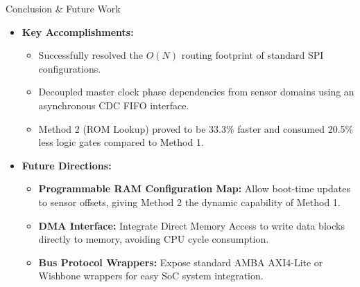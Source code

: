 \documentclass{beamer}
\begin{document}
\begin{frame}{Conclusion \& Future Work}
  \begin{itemize}
    \item \textbf{Key Accomplishments:}
    \begin{itemize}
      \item Successfully resolved the $O(N)$ routing footprint of standard SPI configurations.
      \item Decoupled master clock phase dependencies from sensor domains using an asynchronous CDC FIFO interface.
      \item Method 2 (ROM Lookup) proved to be 33.3\% faster and consumed 20.5\% less logic gates compared to Method 1.
    \end{itemize}
    \item \textbf{Future Directions:}
    \begin{itemize}
      \item \textbf{Programmable RAM Configuration Map:} Allow boot-time updates to sensor offsets, giving Method 2 the dynamic capability of Method 1.
      \item \textbf{DMA Interface:} Integrate Direct Memory Access to write data blocks directly to memory, avoiding CPU cycle consumption.
      \item \textbf{Bus Protocol Wrappers:} Expose standard AMBA AXI4-Lite or Wishbone wrappers for easy SoC system integration.
    \end{itemize}
  \end{itemize}
\end{frame}
\end{document}
